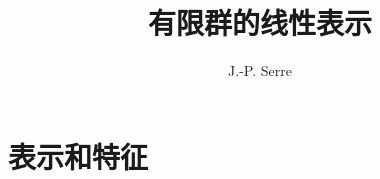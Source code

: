 \documentclass[11pt,a4paper,openany,twoside,leqno]{ctexbook}
\newcommand{\ForceRightPage}{%
  \clearpage
  \ifodd\value{page}\relax
  \else
    \hbox{}\thispagestyle{empty}\newpage
  \fi
}
\begin{document}
\title{有限群的线性表示}
\author{J.-P. Serre}
\date{}
\maketitle
\setcounter{page}{1}

\frontmatter
{}     %
\clearpage
\tableofcontents
\clearpage

\ForceRightPage
\mainmatter

\part{表示和特征}




\end{document}
